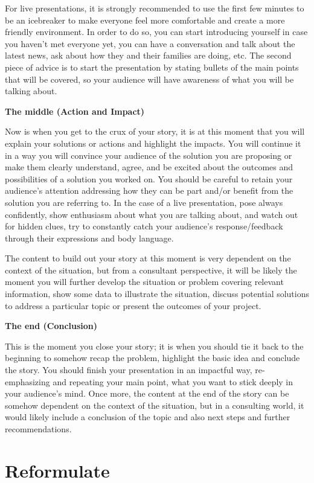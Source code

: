 \documentclass[
]{krantz}
\begin{document}
For live presentations, it is strongly recommended to use the first few minutes to be an icebreaker to make everyone feel more comfortable and create a more friendly environment. In order to do so, you can start introducing yourself in case you haven't met everyone yet, you can have a conversation and talk about the latest news, ask about how they and their families are doing, etc. The second piece of advice is to start the presentation by stating bullets of the main points that will be covered, so your audience will have awareness of what you will be talking about.

\textbf{The middle (Action and Impact)}

Now is when you get to the crux of your story, it is at this moment that you will explain your solutions or actions and highlight the impacts. You will continue it in a way you will convince your audience of the solution you are proposing or make them clearly understand, agree, and be excited about the outcomes and possibilities of a solution you worked on. You should be careful to retain your audience's attention addressing how they can be part and/or benefit from the solution you are referring to. In the case of a live presentation, pose always confidently, show enthusiasm about what you are talking about, and watch out for hidden clues, try to constantly catch your audience's response/feedback through their expressions and body language.

The content to build out your story at this moment is very dependent on the context of the situation, but from a consultant perspective, it will be likely the moment you will further develop the situation or problem covering relevant information, show some data to illustrate the situation, discuss potential solutions to address a particular topic or present the outcomes of your project.

\textbf{The end (Conclusion)}

This is the moment you close your story; it is when you should tie it back to the beginning to somehow recap the problem, highlight the basic idea and conclude the story. You should finish your presentation in an impactful way, re-emphasizing and repeating your main point, what you want to stick deeply in your audience's mind. Once more, the content at the end of the story can be somehow dependent on the context of the situation, but in a consulting world, it would likely include a conclusion of the topic and also next steps and further recommendations.

\hypertarget{reformulate2}{%
\section{Reformulate}\label{reformulate2}}
\end{document}
